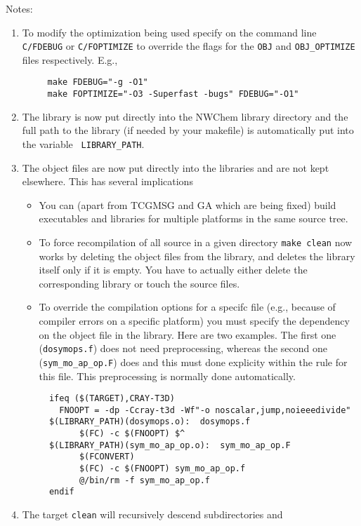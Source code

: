 Notes:
\begin{enumerate}
\item  To modify the optimization being used specify on the command
  line {\tt C/FDEBUG} or {\tt C/FOPTIMIZE} to override the flags for the 
  {\tt OBJ} and {\tt OBJ\_OPTIMIZE} files respectively.  E.g.,
\begin{verbatim}
     make FDEBUG="-g -O1"
     make FOPTIMIZE="-O3 -Superfast -bugs" FDEBUG="-O1"
\end{verbatim}
\item  The library is now put directly into the NWChem library
  directory and the full path to the library (if needed by your
  makefile) is automatically put into the variable {\tt
    LIBRARY\_PATH}.
\item The object files are now put directly into the libraries and are
  not kept elsewhere.  This has several implications
  \begin{itemize}
  \item You can (apart from TCGMSG and GA which are being fixed) build
    executables and libraries for multiple platforms in the same
    source tree.
  \item To force recompilation of all source in a given directory 
    \verb+make clean+ now works by deleting the object files from
    the library, and deletes the library itself only if it is empty.
    You have to
    actually either delete the corresponding library or touch the
    source files.
  \item To override the compilation options for a specifc file (e.g.,
    because of compiler errors on a specific platform) you must
    specify the dependency on the object file in the library.  Here
    are two examples.  The first one (\verb+dosymops.f+) does not need
    preprocessing, whereas the second one (\verb+sym_mo_ap_op.F+) does
    and this must done explicity within the rule for this file.
    This preprocessing is normally done automatically.
\begin{verbatim}
  ifeq ($(TARGET),CRAY-T3D)
    FNOOPT = -dp -Ccray-t3d -Wf"-o noscalar,jump,noieeedivide"
  $(LIBRARY_PATH)(dosymops.o):  dosymops.f
        $(FC) -c $(FNOOPT) $^
  $(LIBRARY_PATH)(sym_mo_ap_op.o):  sym_mo_ap_op.F
        $(FCONVERT)
        $(FC) -c $(FNOOPT) sym_mo_ap_op.f
        @/bin/rm -f sym_mo_ap_op.f
  endif
\end{verbatim}
  \end{itemize}
\item The target {\tt clean} will recursively descend subdirectories and

\end{enumerate}

